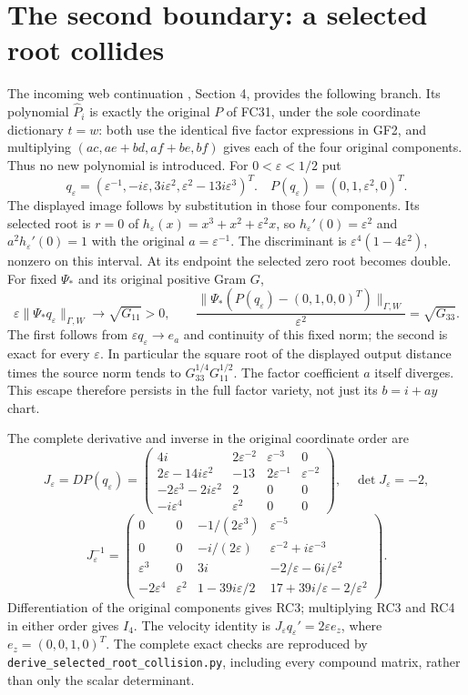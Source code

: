 \documentclass[11pt]{article}
\begin{document}
\section{The second boundary: a selected root collides}
The incoming web continuation \cite{WebFable}, Section 4, provides
the following branch. Its polynomial $\widehat P_i$ is exactly the
original $P$ of FC31, under the sole coordinate dictionary $t=w$:
both use the identical five factor expressions in GF2, and multiplying
$(ac,ae+bd,af+be,bf)$ gives each of the four original components.
Thus no new polynomial is introduced. For $0<\varepsilon<1/2$ put
\[
 q_\varepsilon=(\varepsilon^{-1},-i\varepsilon,
          3i\varepsilon^2,\varepsilon^2-13i\varepsilon^3)^T.
 \quad P(q_\varepsilon)=(0,1,\varepsilon^2,0)^T.
 \tag{RC1}
\]
The displayed image follows by substitution in those four components.
Its selected root is $r=0$ of $h_\varepsilon(x)=x^3+x^2+
\varepsilon^2x$, so $h_\varepsilon'(0)=\varepsilon^2$ and
$a^2h_\varepsilon'(0)=1$ with the original $a=\varepsilon^{-1}$.
The discriminant is $\varepsilon^4(1-4\varepsilon^2)$, nonzero
on this interval. At its endpoint the selected zero root becomes
double. For fixed $\Psi_*$ and its original positive Gram $G$,
\[
 \varepsilon\|\Psi_*q_\varepsilon\|_{\Gamma,W}
       \longrightarrow\sqrt{G_{11}}>0,\qquad
 \frac{\|\Psi_*(P(q_\varepsilon)-(0,1,0,0)^T)\|_{\Gamma,W}}
      {\varepsilon^2}=\sqrt{G_{33}}.
 \tag{RC2}
\]
The first follows from $\varepsilon q_\varepsilon\to e_a$ and
continuity of this fixed norm; the second is exact for every
$\varepsilon$. In particular the square root of the displayed
output distance times the source norm tends to
$G_{33}^{1/4}G_{11}^{1/2}$. The factor coefficient $a$ itself
diverges. This escape therefore persists in the full factor variety,
not just its $b=i+ay$ chart.

The complete derivative and inverse in the original coordinate order
are
\[
 J_\varepsilon=DP(q_\varepsilon)=
 \begin{pmatrix}
 4i&2\varepsilon^{-2}&\varepsilon^{-3}&0\\
 2\varepsilon-14i\varepsilon^2&-13&2\varepsilon^{-1}&\varepsilon^{-2}\\
 -2\varepsilon^3-2i\varepsilon^2&2&0&0\\
 -i\varepsilon^4&\varepsilon^2&0&0
 \end{pmatrix},\quad\det J_\varepsilon=-2, \tag{RC3}
\]
\[
 J_\varepsilon^{-1}=
 \begin{pmatrix}
 0&0&-1/(2\varepsilon^3)&\varepsilon^{-5}\\
 0&0&-i/(2\varepsilon)&\varepsilon^{-2}+i\varepsilon^{-3}\\
 \varepsilon^3&0&3i&-2/\varepsilon-6i/\varepsilon^2\\
 -2\varepsilon^4&\varepsilon^2&1-39i\varepsilon/2&
                  17+39i/\varepsilon-2/\varepsilon^2
 \end{pmatrix}. \tag{RC4}
\]
Differentiation of the original components gives RC3; multiplying
RC3 and RC4 in either order gives $I_4$. The velocity identity is
$J_\varepsilon q_\varepsilon'=2\varepsilon e_z$, where
$e_z=(0,0,1,0)^T$. The complete exact checks are reproduced by
\texttt{derive\_selected\_root\_collision.py}, including every
compound matrix, rather than only the scalar determinant.
\end{document}
